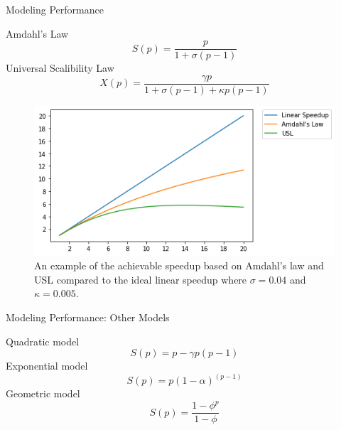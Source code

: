 \documentclass[10pt]{beamer}
\begin{document}
\begin{frame}{Modeling Performance}
	\begin{outline}
		\1Amdahl's Law
			$$S(p) = \frac{p}{1+\sigma(p-1)}$$
		\1Universal Scalibility Law
		$$X(p) = \frac{\gamma{p}}{1+\sigma(p-1)+\kappa{p}(p-1)}$$
		\begin{figure}[H]
			\centering
			\includegraphics[scale=0.4]{images/amdahls.png}
			\caption{An example of the achievable speedup based on Amdahl's law and USL compared to the ideal linear speedup where $\sigma=0.04$ and $\kappa=0.005$.}	
			\label{fig_Amdahl}
		\end{figure}
		

	\end{outline}
\end{frame}

\begin{frame}{Modeling Performance: Other Models}
	\begin{outline}
		\1Quadratic model
		$$ S(p) = p-\gamma{p(p-1)}$$
		\1Exponential model
		$$S(p) = p(1-\alpha)^{(p-1)}$$
		\1Geometric model
		$$S(p) = \frac{1-\phi^{p}}{1-\phi}$$
	\end{outline}
\end{frame}
\end{document}
